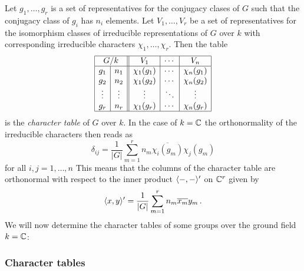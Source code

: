 \begin{fluff}
  Let $g_1, \dotsc, g_r$ is a set of representatives for the conjugacy clases of $G$ such that the conjugacy class of $g_i$ has $n_i$ elements.
  Let $V_1, \dotsc, V_r$ be a set of representatives for the isomorphism classes of irreducible representations of $G$ over $k$ with corresponding irreducible characters $\chi_1, \dotsc, \chi_r$.
  Then the table
  \[
    \begin{array}{|c|c||c|c|c|}
      \hline
        \multicolumn{2}{|c||}{G/k}
      & V_1
      & \cdots
      & V_n
      \\
      \hline
        g_1
      & n_1
      & \chi_1(g_1)
      & \cdots
      & \chi_n(g_1)
      \\
        g_2
      & n_2
      & \chi_1(g_2)
      & \cdots
      & \chi_n(g_2)
      \\
        \vdots
      & \vdots
      & \vdots
      & \ddots
      & \vdots
      \\
        g_r
      & n_r
      & \chi_1(g_r)
      & \cdots
      & \chi_n(g_r)
      \\
      \hline
    \end{array}
  \]
  is the \emph{character table} of $G$ over $k$.
  In the case of $k = \mathbb{C}$ the orthonormality of the irreducible characters then reads as
  \[
      \delta_{ij}
    = \frac{1}{|G|} \sum_{m=1}^r n_m \overline{\chi_i(g_m)} \chi_j(g_m)
  \]
  for all $i, j = 1, \dotsc, n$
  This means that the columns of the character table are orthonormal with respect to the inner product $\langle -,- \rangle'$ on $\mathbb{C}^r$ given by
  \[
      \langle x,y \rangle'
    = \frac{1}{|G|} \sum_{m=1}^r n_m \overline{x_m} y_m \,.
  \]
  We will now determine the character tables of some groups over the ground field $k = \mathbb{C}$:
\end{fluff}



\subsubsection{Character tables}


